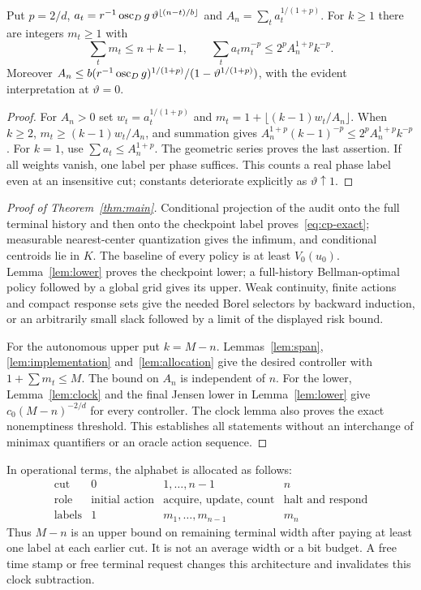 \begin{lemma}\label{lem:allocation}
Put $p=2/d$, $a_t=r^{-1}\operatorname{osc}_Dg\,\vartheta^{\lfloor(n-t)/b\rfloor}$ and $A_n=\sum_ta_t^{1/(1+p)}$. For $k\ge1$ there are integers $m_t\ge1$ with
\[
 \sum_tm_t\le n+k-1,\qquad
 \sum_ta_tm_t^{-p}\le2^pA_n^{1+p}k^{-p}.
\]
Moreover $A_n\le b(r^{-1}\operatorname{osc}_Dg)^{1/(1+p)}/(1-\vartheta^{1/(1+p)})$, with the evident interpretation at $\vartheta=0$.
\end{lemma}
\begin{proof}
For $A_n>0$ set $w_t=a_t^{1/(1+p)}$ and
$m_t=1+\lfloor(k-1)w_t/A_n\rfloor$. When $k\ge2$, $m_t\ge(k-1)w_t/A_n$, and summation gives $A_n^{1+p}(k-1)^{-p}\le2^pA_n^{1+p}k^{-p}$. For $k=1$, use $\sum a_t\le A_n^{1+p}$. The geometric series proves the last assertion. If all weights vanish, one label per phase suffices. This counts a real phase label even at an insensitive cut; constants deteriorate explicitly as $\vartheta\uparrow1$.
\end{proof}

\begin{proof}[Proof of Theorem~\ref{thm:main}]
Conditional projection of the audit onto the full terminal history and then onto the checkpoint label proves~\eqref{eq:cp-exact}; measurable nearest-center quantization gives the infimum, and conditional centroids lie in $K$. The baseline of every policy is at least $V_0(u_0)$. Lemma~\ref{lem:lower} proves the checkpoint lower; a full-history Bellman-optimal policy followed by a global grid gives its upper. Weak continuity, finite actions and compact response sets give the needed Borel selectors by backward induction, or an arbitrarily small slack followed by a limit of the displayed risk bound.

For the autonomous upper put $k=M-n$. Lemmas~\ref{lem:span}, \ref{lem:implementation} and~\ref{lem:allocation} give the desired controller with $1+\sum m_t\le M$. The bound on $A_n$ is independent of $n$. For the lower, Lemma~\ref{lem:clock} and the final Jensen lower in Lemma~\ref{lem:lower} give $c_0(M-n)^{-2/d}$ for every controller. The clock lemma also proves the exact nonemptiness threshold. This establishes all statements without an interchange of minimax quantifiers or an oracle action sequence.
\end{proof}

In operational terms, the alphabet is allocated as follows:
\[
\begin{array}{c|ccc}
\text{cut}&0&1,\ldots,n-1&n\\\hline
\text{role}&\text{initial action}&\text{acquire, update, count}&\text{halt and respond}\\
\text{labels}&1&m_1,\ldots,m_{n-1}&m_n
\end{array}
\]
Thus $M-n$ is an upper bound on remaining terminal width after paying at least one label at each earlier cut. It is not an average width or a bit budget. A free time stamp or free terminal request changes this architecture and invalidates this clock subtraction.
